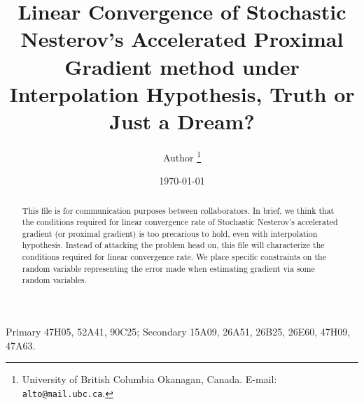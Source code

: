 \documentclass[12pt]{article}
\begin{document}
\title{{\selectfont Linear Convergence of Stochastic Nesterov's Accelerated Proximal Gradient method under Interpolation Hypothesis, Truth or Just a Dream?}}

\author{
    Author
    \thanks{
        University of British Columbia Okanagan,
        Canada. E-mail: \texttt{alto@mail.ubc.ca}.
    }
}

\date{\today}

\maketitle
{}

\begin{abstract} 
    This file is for communication purposes between collaborators. 
    In brief, we think that the conditions required for linear convergence rate of Stochastic Nesterov's accelerated gradient (or proximal gradient) is too precarious to hold, even with interpolation hypothesis. 
    Instead of attacking the problem head on, this file will characterize the conditions required for linear convergence rate. 
    We place specific constraints on the random variable representing the error made when estimating gradient via some random variables. 
\end{abstract}

Primary 47H05, 52A41, 90C25; Secondary 15A09, 26A51, 26B25, 26E60, 47H09, 47A63.


\end{document}
